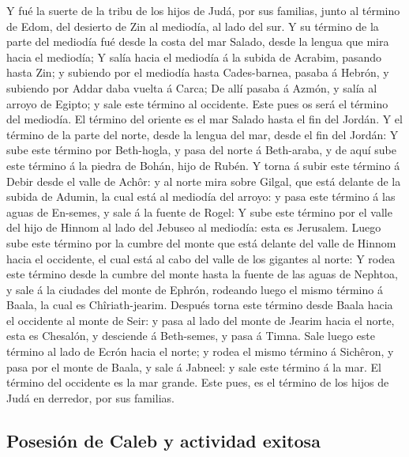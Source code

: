  Y fué la suerte de la tribu de los hijos de Judá, por sus
familias, junto al término de Edom, del desierto de Zin al mediodía, al
lado del sur.  Y su término de la parte del mediodía fué
desde la costa del mar Salado, desde la lengua que mira hacia el
mediodía;  Y salía hacia el mediodía á la subida de
Acrabim, pasando hasta Zin; y subiendo por el mediodía hasta
Cades-barnea, pasaba á Hebrón, y subiendo por Addar daba vuelta á Carca;
 De allí pasaba á Azmón, y salía al arroyo de Egipto; y
sale este término al occidente. Este pues os será el término del
mediodía.  El término del oriente es el mar Salado hasta
el fin del Jordán. Y el término de la parte del norte, desde la lengua
del mar, desde el fin del Jordán:  Y sube este término por
Beth-hogla, y pasa del norte á Beth-araba, y de aquí sube este término á
la piedra de Bohán, hijo de Rubén.  Y torna á subir este
término á Debir desde el valle de Achôr: y al norte mira sobre Gilgal,
que está delante de la subida de Adumin, la cual está al mediodía del
arroyo: y pasa este término á las aguas de En-semes, y sale á la fuente
de Rogel:  Y sube este término por el valle del hijo de
Hinnom al lado del Jebuseo al mediodía: esta es Jerusalem. Luego sube
este término por la cumbre del monte que está delante del valle de
Hinnom hacia el occidente, el cual está al cabo del valle de los
gigantes al norte:  Y rodea este término desde la cumbre
del monte hasta la fuente de las aguas de Nephtoa, y sale á la ciudades
del monte de Ephrón, rodeando luego el mismo término á Baala, la cual es
Chîriath-jearim.  Después torna este término desde Baala
hacia el occidente al monte de Seir: y pasa al lado del monte de Jearim
hacia el norte, esta es Chesalón, y desciende á Beth-semes, y pasa á
Timna.  Sale luego este término al lado de Ecrón hacia el
norte; y rodea el mismo término á Sichêron, y pasa por el monte de
Baala, y sale á Jabneel: y sale este término á la mar. 
El término del occidente es la mar grande. Este pues, es el término de
los hijos de Judá en derredor, por sus familias.

\hypertarget{posesiuxf3n-de-caleb-y-actividad-exitosa}{%
\subsection{Posesión de Caleb y actividad
exitosa}\label{posesiuxf3n-de-caleb-y-actividad-exitosa}}


